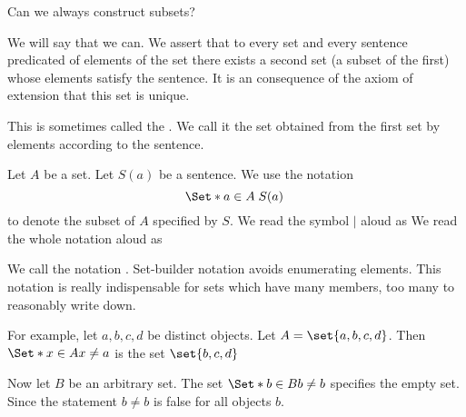 

Can we always construct
subsets?


We will say that we can.
We assert that to
every set and every sentence
predicated of elements of the
set there exists a second
set (a subset of the first)
whose elements satisfy
the sentence.
It is an consequence of the axiom
of extension that this set is unique.

This is sometimes called
the .
We call it the set obtained
from the first set by
 elements
according to the sentence.


Let $A$ be a set.
Let $S(a)$ be a sentence.
We use the notation
\[
  \Set*{a \in A}{\;S(a)\;}
\]
to denote the subset of $A$
specified by $S$.
We read the symbol $\mid$ aloud as
We read the whole notation aloud as

We call the notation
.
Set-builder notation avoids enumerating
elements.
This notation is really indispensable for
sets which have many members, too many
to reasonably write down.


For example, let $a, b, c, d$
be distinct objects.
Let $A = \set{a, b, c, d}$.
Then
$\Set*{x \in A}{x \neq a}$
is the set $\set{b, c, d}$

Now let $B$ be an arbitrary
set.
The set $\Set*{b \in B}{b \neq b}$
specifies the empty set.
Since the statement $b \neq b$ is
false for all objects $b$.

